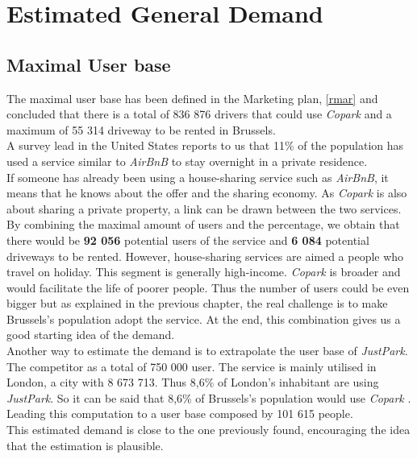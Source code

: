 \documentclass[12pt,a4paper,oneside]{book}
\newcommand{\bp}{\textit{Copark }}
\begin{document}
\section{Estimated General Demand}

\subsection{Maximal User base}

\label{mubsec}

The maximal user base has been defined in the Marketing plan, \autoref{rmar} and concluded that there is a total of 836 876 drivers that could use \bp and a maximum of 55 314 driveway to be rented in Brussels.\\

A survey lead in the United States reports to us that 11\% of the population has used a service similar to \textit{AirBnB} to stay overnight in a private residence.\cite{airbnbuse}\\
If someone has already been using a house-sharing service such as \textit{AirBnB}, it means that he knows about the offer and the sharing economy. As \bp is also about sharing a private property, a link can be drawn between the two services.\\

By combining the maximal amount of users and the percentage, we obtain that there would be \textbf{92 056} potential users of the service and \textbf{6 084} potential driveways to be rented. However, house-sharing services are aimed a people who travel on holiday. This segment is generally high-income. \bp is broader and would facilitate the life of poorer people. Thus the number of users could be even bigger but as explained in the previous chapter, the real challenge is to make Brussels's population adopt the service. At the end, this combination gives us a good starting idea of the demand.\\

Another way to estimate the demand is to extrapolate the user base of \textit{JustPark}. The competitor as a total of 750 000 user\cite{jpu}. The service is mainly utilised in London, a city with 8 673 713.\cite{ciafb} Thus 8,6\% of London's inhabitant are using \textit{JustPark}. So it can be said that 8,6\% of Brussels's population would use \bp. Leading this computation to a user base composed by 101 615 people.\\
This estimated demand is close to the one previously found, encouraging the idea that the estimation is plausible.\\
\end{document}
